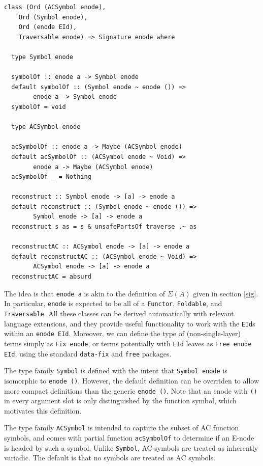 \documentclass[12pt,a4paper,twoside,openright]{report}
\numberwithin{equation}{chapter}		%
\numberwithin{figure}{chapter}			%
\numberwithin{table}{chapter}			%
\theoremstyle{definition}
\theoremstyle{plain}
\begin{document}
\begin{verbatim}
class (Ord (ACSymbol enode),
	Ord (Symbol enode),
	Ord (enode EId),
	Traversable enode) => Signature enode where
		
  type Symbol enode

  symbolOf :: enode a -> Symbol enode
  default symbolOf :: (Symbol enode ~ enode ()) =>
  		enode a -> Symbol enode
  symbolOf = void

  type ACSymbol enode

  acSymbolOf :: enode a -> Maybe (ACSymbol enode)
  default acSymbolOf :: (ACSymbol enode ~ Void) =>
  		enode a -> Maybe (ACSymbol enode)
  acSymbolOf _ = Nothing

  reconstruct :: Symbol enode -> [a] -> enode a
  default reconstruct :: (Symbol enode ~ enode ()) =>
  		Symbol enode -> [a] -> enode a
  reconstruct s as = s & unsafePartsOf traverse .~ as

  reconstructAC :: ACSymbol enode -> [a] -> enode a
  default reconstructAC :: (ACSymbol enode ~ Void) =>
  		ACSymbol enode -> [a] -> enode a
  reconstructAC = absurd
\end{verbatim}

The idea is that \texttt{enode a} is akin to the definition of $\Sigma(A)$ given in section \ref{sig}. In particular, \texttt{enode} is expected to be all of a \texttt{Functor}, \texttt{Foldable}, and \texttt{Traversable}. All these classes can be derived automatically with relevant language extensions, and they provide useful functionality to work with the \texttt{EId}s within an \texttt{enode EId}. Moreover, we can define the type of (non-single-layer) terms simply as \texttt{Fix enode}, or terms potentially with \texttt{EId} leaves as \texttt{Free enode EId}, using the standard \texttt{data-fix} and \texttt{free} packages.

The type family \texttt{Symbol} is defined with the intent that \texttt{Symbol enode} is isomorphic to \texttt{enode ()}. However, the default definition can be overriden to allow more compact definitions than the generic \texttt{enode ()}. Note that an enode with \texttt{()} in every argument slot is only distinguished by the function symbol, which motivates this definition.

The type family \texttt{ACSymbol} is intended to capture the subset of AC function symbols, and comes with partial function \texttt{acSymbolOf} to determine if an E-node is headed by such a symbol. Unlike \texttt{Symbol}, AC-symbols are treated as inherently variadic. The default is that no symbols are treated as AC symbols.
\end{document}
